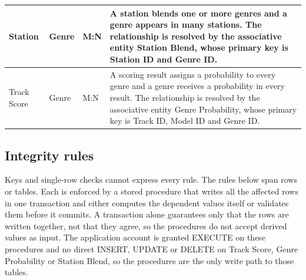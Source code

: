 \documentclass[11pt]{article}
\begin{document}
\begin{longtable}{|L{1.15in}|L{1.15in}|L{0.9in}|L{3.05in}|}
Station & Genre & M:N & A station blends one or more genres and a genre appears in many stations. The relationship is resolved by the associative entity Station Blend, whose primary key is Station ID and Genre ID. \\ \hline
Track Score & Genre & M:N & A scoring result assigns a probability to every genre and a genre receives a probability in every result. The relationship is resolved by the associative entity Genre Probability, whose primary key is Track ID, Model ID and Genre ID. \\ \hline
\end{longtable}

\subsection{Integrity rules}\label{sec:integ}
Keys and single-row checks cannot express every rule. The rules below span rows or tables. Each is
enforced by a stored procedure that writes all the affected rows in one transaction and either computes
the dependent values itself or validates them before it commits. A transaction alone guarantees only
that the rows are written together, not that they agree, so the procedures do not accept derived
values as input. The application account is granted EXECUTE on these procedures and no direct INSERT,
UPDATE or DELETE on Track Score, Genre Probability or Station Blend, so the procedures are the only
write path to those tables.
\end{document}
